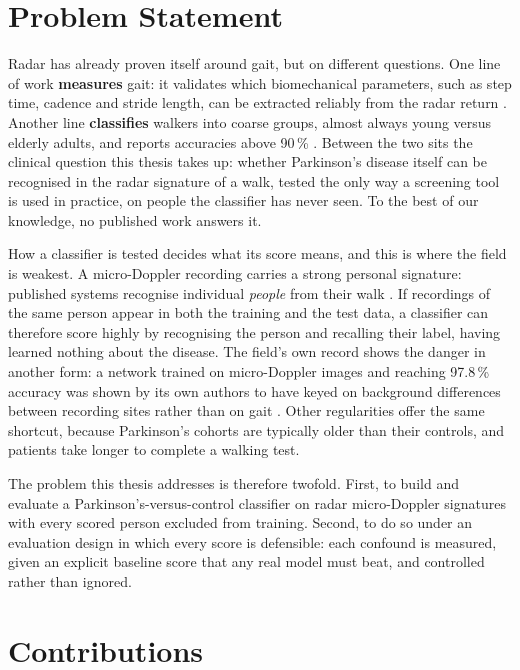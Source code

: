 \section{Problem Statement}
\label{sec:problem}

Radar has already proven itself around gait, but on different questions.
One line of work \textbf{measures} gait: it validates which biomechanical
parameters, such as step time, cadence and stride length, can be extracted
reliably from the radar return \cite{seifert2020,lopezdelgado2026}. Another
line \textbf{classifies} walkers into coarse groups, almost always young
versus elderly adults, and reports accuracies above 90\,\%
\cite{hayashi2021,hoshiga2021}. Between the two sits the clinical question
this thesis takes up: whether Parkinson's disease itself can be recognised
in the radar signature of a walk, tested the only way a screening tool is
used in practice, on people the classifier has never seen. To the best of
our knowledge, no published work answers it.

How a classifier is tested decides what its score means, and this is where
the field is weakest. A micro-Doppler recording carries a strong personal
signature: published systems recognise individual \emph{people} from their
walk \cite{papanastasiou2020,ni2020}. If recordings of the same person
appear in both the training and the test data, a classifier can therefore
score highly by recognising the person and recalling their label, having
learned nothing about the disease. The field's own record shows the danger
in another form: a network trained on micro-Doppler images and reaching
97.8\,\% accuracy was shown
by its own authors to have keyed on background differences between
recording sites rather than on gait \cite{hayashi2021}. Other regularities
offer the same shortcut, because Parkinson's cohorts are typically older
than their controls, and patients take longer to complete a walking test.

The problem this thesis addresses is therefore twofold. First, to build and
evaluate a Parkinson's-versus-control classifier on radar micro-Doppler
signatures with every scored person excluded from training. Second, to do
so under an evaluation design in which every score is defensible: each
confound is measured, given an explicit baseline score that any real model
must beat, and controlled rather than ignored.

\section{Contributions}
\label{sec:contributions}

